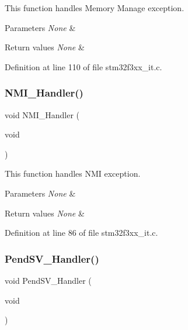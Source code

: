 This function handles Memory Manage exception. 


\begin{DoxyParams}{Parameters}
{\em None} & \\
\hline
\end{DoxyParams}

\begin{DoxyRetVals}{Return values}
{\em None} & \\
\hline
\end{DoxyRetVals}


Definition at line 110 of file stm32f3xx\+\_\+it.\+c.

\mbox{\label{group___c_a_n___networking_ga6ad7a5e3ee69cb6db6a6b9111ba898bc}} 
\subsubsection{N\+M\+I\+\_\+\+Handler()}
{\footnotesize\ttfamily void N\+M\+I\+\_\+\+Handler (\begin{DoxyParamCaption}\item[{void}]{ }\end{DoxyParamCaption})}



This function handles N\+MI exception. 


\begin{DoxyParams}{Parameters}
{\em None} & \\
\hline
\end{DoxyParams}

\begin{DoxyRetVals}{Return values}
{\em None} & \\
\hline
\end{DoxyRetVals}


Definition at line 86 of file stm32f3xx\+\_\+it.\+c.

\mbox{\label{group___c_a_n___networking_ga6303e1f258cbdc1f970ce579cc015623}} 
\subsubsection{Pend\+S\+V\+\_\+\+Handler()}
{\footnotesize\ttfamily void Pend\+S\+V\+\_\+\+Handler (\begin{DoxyParamCaption}\item[{void}]{ }\end{DoxyParamCaption})}



